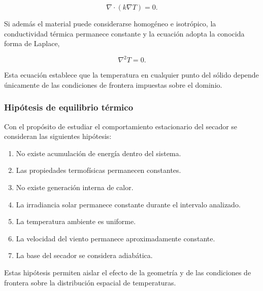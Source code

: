 \begin{equation}
\nabla\cdot(k\nabla T)=0.
\end{equation}

Si además el material puede considerarse homogéneo e isotrópico, la conductividad térmica permanece constante y la ecuación adopta la conocida forma de Laplace,

\begin{equation}
\boxed{
\nabla^2T=0.
}
\label{eq:laplace}
\end{equation}

Esta ecuación establece que la temperatura en cualquier punto del sólido depende únicamente de las condiciones de frontera impuestas sobre el dominio.

\subsubsection{Hipótesis de equilibrio térmico}

Con el propósito de estudiar el comportamiento estacionario del secador se consideran las siguientes hipótesis:

\begin{enumerate}

\item No existe acumulación de energía dentro del sistema.

\item Las propiedades termofísicas permanecen constantes.

\item No existe generación interna de calor.

\item La irradiancia solar permanece constante durante el intervalo analizado.

\item La temperatura ambiente es uniforme.

\item La velocidad del viento permanece aproximadamente constante.

\item La base del secador se considera adiabática.

\end{enumerate}

Estas hipótesis permiten aislar el efecto de la geometría y de las condiciones de frontera sobre la distribución espacial de temperaturas.

